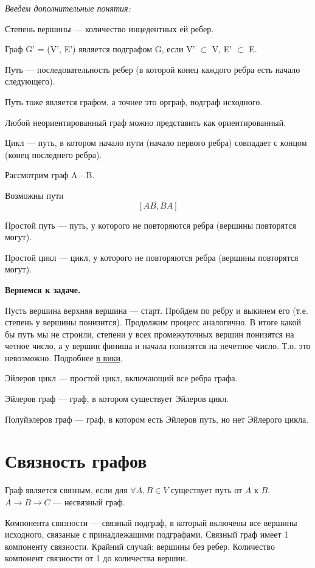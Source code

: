 \documentclass[a4paper,12pt]{article}
\theoremstyle{plain} %
\theoremstyle{definition} %
\theoremstyle{remark} %
\begin{document}
\textit{Введем дополнительные понятия:}

Степень вершины --- количество инцедентных ей ребер.

Граф G' = (V', E') является подграфом G, если V' $\subset$ V, E' $\subset$ E.

Путь --- последовательность ребер (в которой конец каждого ребра есть начало следующего).

Путь тоже является графом, а точнее это орграф, подграф исходного.

Любой неориентированный граф можно представить как ориентированный.

Цикл --- путь, в котором начало пути (начало первого ребра) совпадает с концом (конец последнего ребра).

Рассмотрим граф A---B.

Возможны пути
$$[AB, BA]$$

Простой путь --- путь, у которого не повторяются ребра (вершины повторятся могут).

Простой цикл ---  цикл, у которого не повторяются ребра (вершины повторятся могут).

\textbf{Вернемся к задаче.}

Пусть вершина верхняя вершина --- старт. Пройдем по ребру и выкинем его (т.е. степень у вершины понизится). Продолжим процесс аналогично. В итоге какой бы путь мы не строили, степени у всех промежуточных вершин понизятся на четное число, а у вершин финиша и начала понизятся на нечетное число. Т.о. это невозможно. Подробнее \href{https://ru.wikipedia.org/wiki/%D0%97%D0%B0%D0%B4%D0%B0%D1%87%D0%B0_%D0%BE_%D1%81%D0%B5%D0%BC%D0%B8_%D0%BA%D1%91%D0%BD%D0%B8%D0%B3%D1%81%D0%B1%D0%B5%D1%80%D0%B3%D1%81%D0%BA%D0%B8%D1%85_%D0%BC%D0%BE%D1%81%D1%82%D0%B0%D1%85}{в вики}.

Эйлеров цикл --- простой цикл, включающий все ребра графа.

Эйлеров граф --- граф, в котором существует Эйлеров цикл.

Полуйэлеров граф --- граф, в котором есть Эйлеров путь, но нет Эйлерого цикла.

\section{Связность графов}
Граф является связным, если для $\forall A,B \in V$ существует путь от $A$ к $B$.\\
$A\longrightarrow B\longrightarrow C$ --- несвязный граф.

Компонента связности --- связный подграф, в который включены все вершины исходного, связаные с принадлежащими подграфами. Связный граф имеет 1 компоненту связности. Крайний случай: вершины без ребер. Количество компонент связности от 1 до количества вершин.
\end{document}
